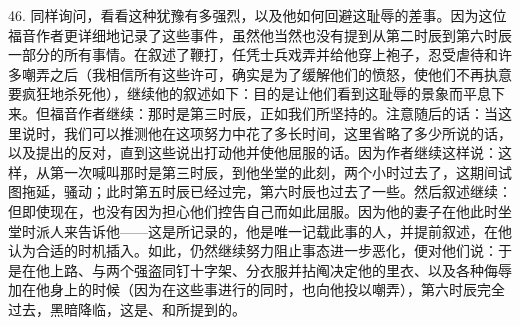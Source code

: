 46. 同样询问，看看这种犹豫有多强烈，以及他如何回避这耻辱的差事。因为这位福音作者更详细地记录了这些事件，虽然他当然也没有提到从第二时辰到第六时辰一部分的所有事情。在叙述了鞭打，任凭士兵戏弄并给他穿上袍子，忍受虐待和许多嘲弄之后（我相信所有这些许可，确实是为了缓解他们的愤怒，使他们不再执意要疯狂地杀死他），继续他的叙述如下：目的是让他们看到这耻辱的景象而平息下来。但福音作者继续：那时是第三时辰，正如我们所坚持的。注意随后的话：当这里说时，我们可以推测他在这项努力中花了多长时间，这里省略了多少所说的话，以及提出的反对，直到这些说出打动他并使他屈服的话。因为作者继续这样说：这样，从第一次喊叫那时是第三时辰，到他坐堂的此刻，两个小时过去了，这期间试图拖延，骚动；此时第五时辰已经过完，第六时辰也过去了一些。然后叙述继续：但即使现在，也没有因为担心他们控告自己而如此屈服。因为他的妻子在他此时坐堂时派人来告诉他——这是所记录的，他是唯一记载此事的人，并提前叙述，在他认为合适的时机插入。如此，仍然继续努力阻止事态进一步恶化，便对他们说：于是在他上路、与两个强盗同钉十字架、分衣服并拈阄决定他的里衣、以及各种侮辱加在他身上的时候（因为在这些事进行的同时，也向他投以嘲弄），第六时辰完全过去，黑暗降临，这是、和所提到的。\par


